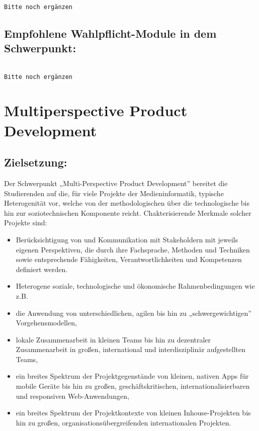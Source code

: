 \begin{verbatim}

Bitte noch ergänzen
\end{verbatim}

\section*{Empfohlene Wahlpflicht-Module in dem
Schwerpunkt:}\label{empfohlene-wahlpflicht-module-in-dem-schwerpunkt}

\begin{verbatim}

Bitte noch ergänzen
\end{verbatim}

\chapter{Multiperspective Product
Development}\label{multiperspective-product-development}

\section*{Zielsetzung:}\label{zielsetzung}

Der Schwerpunkt „Multi-Perspective Product Development'' bereitet die
Studierenden auf die, für viele Projekte der Medieninformatik, typische
Heterogenität vor, welche von der methodologischen über die
technologische bis hin zur soziotechnischen Komponente reicht.
Chakterisierende Merkmale solcher Projekte sind:

\begin{itemize}
\item
  Berücksichtigung von und Kommunikation mit Stakeholdern mit jeweils
  eigenen Perspektiven, die durch ihre Fachsprache, Methoden und
  Techniken sowie entsprechende Fähigkeiten, Verantwortlichkeiten und
  Kompetenzen definiert werden.
\item
  Heterogene soziale, technologische und ökonomische Rahmenbedingungen
  wie z.B.
\item
  die Anwendung von unterschiedlichen, agilen bis hin zu
  „schwergewichtigen'' Vorgehensmodellen,
\item
  lokale Zusammenarbeit in kleinen Teams bis hin zu dezentraler
  Zusammenarbeit in großen, international und interdisziplinär
  aufgestellten Teams,
\item
  ein breites Spektrum der Projektgegenstände von kleinen, nativen Apps
  für mobile Geräte bis hin zu großen, geschäftskritischen,
  internationalisierbaren und responsiven Web-Anwendungen,
\item
  ein breites Spektrum der Projektkontexte von kleinen Inhouse-Projekten
  bis hin zu großen, organisationsübergreifenden internationalen
  Projekten.
\end{itemize}

